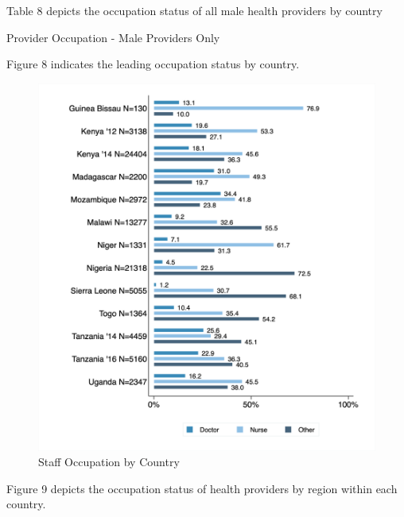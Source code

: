 \documentclass{article}                 %
\begin{document}
	Table 8 depicts the occupation status of all male health providers by country 	
		
			\begin{table}[H]
				\centering
				\caption{Provider Occupation - Male Providers Only}
				
			\end{table}
		
	Figure 8 indicates the leading occupation status by country. 	
		
			\begin{figure}[H] 
				\centering
				\caption{Staff Occupation  by Country} 
				\includegraphics[width=\textwidth]{"../Output/Final/Staff_all"}
			\end{figure}
		
	Figure 9 depicts the occupation status of health providers by region within each country.	
		
\end{document}
